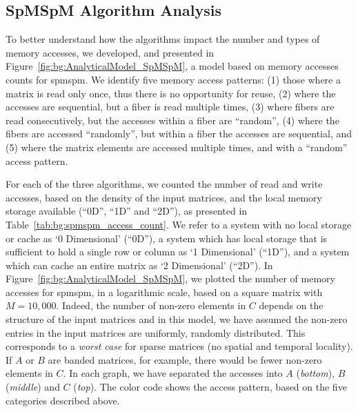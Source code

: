 \subsection{SpMSpM Algorithm Analysis}
\label{sec:bg:AnalyticalModel}

To better understand how the algorithms impact the number and types of memory accesses, we developed, and presented in Figure~\ref{fig:bg:AnalyticalModel_SpMSpM}, a model based on memory accesses counts for \acrshort{spmspm}.
We identify five memory access patterns: (1) those where a matrix is read only once, thus there is no opportunity for reuse, (2) where the accesses are sequential, but a \gls{fiber} is read multiple times, (3) where \glspl{fiber} are read consecutively, but the accesses within a \gls{fiber} are ``random'', (4) where the \glspl{fiber} are accessed ``randomly'', but within a \gls{fiber} the accesses are sequential, and (5) where the matrix elements are accessed multiple times, and with a ``random'' access pattern.

For each of the three algorithms, we counted the number of read and write accesses, based on the density of the input matrices, and the local memory storage available (``0D'', ``1D'' and ``2D''), as presented in Table~\ref{tab:bg:spmspm_access_count}.
We refer to a system with no local storage or cache as `0 Dimensional' (``0D''), a system which has local storage that is sufficient to hold a single row or column as `1 Dimensional' (``1D''), and a system which can cache an entire matrix as `2 Dimensional' (``2D'').
In Figure~\ref{fig:bg:AnalyticalModel_SpMSpM}, we plotted the number of memory accesses for \acrshort{spmspm}, in a logarithmic scale, based on a square matrix with $M = 10,000$.
Indeed, the number of non-zero elements in $C$ depends on the structure of the input matrices and in this model, we have assumed the non-zero entries in the input matrices are uniformly, randomly distributed.
This corresponds to a \emph{worst case} for sparse matrices (no spatial and temporal locality).
If $A$ or $B$ are \gls{banded} matrices, for example, there would be fewer non-zero elements in $C$.
In each graph, we have separated the accesses into $A$ (\textit{bottom}), $B$ (\textit{middle}) and $C$ (\textit{top}).
The color code shows the access pattern, based on the five categories described above.

